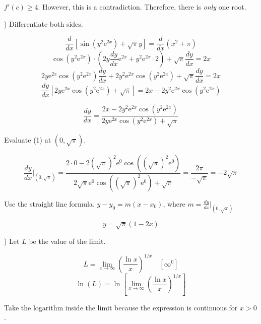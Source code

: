 \documentclass{article}
\begin{document}
\hfill

\noindent $f'(c)\geq4$. However, this is a contradiction. Therefore, there is \textit{only} one root.

\hfill

) Differentiate both sides.

\[\frac d{dx}\left[\sin(y^2\mathrm{e}^{2x})+\sqrt\pi y\right] =\frac {d}{dx} \left(x^2+\pi\right)\]
\[\cos\left(y^2\mathrm{e}^{2x}\right)\cdot\left(2y{\frac{dy}{dx}\mathrm{e}^{2x}}+y^2\mathrm{e}^{2x}\cdot2\right)+\sqrt\pi\frac{dy}{dx}=2x\]
\[2y{\mathrm{e}^{2x}}\cos\left(y^2\mathrm{e}^{2x}\right)\frac{dy}{dx}+2y^2\mathrm{e}^{2x}\cos\left(y^2\mathrm{e}^{2x}\right)+\sqrt\pi\frac{dy}{dx}=2x\]
\[\frac{dy}{dx}\left[2y\mathrm{e}^{2x}\cos\left(y^2\mathrm{e}^{2x}\right)+\sqrt\pi\right]=2x-2y^2{\mathrm{e}^{2x}}\cos\left(y^2\mathrm{e}^{2x}\right)\]

\begin{equation}\frac{dy}{dx}=\frac{2x-2y^2{\mathrm{e}^{2x}}\cos\left(y^2\mathrm{e}^{2x}\right)}{2y\mathrm{e}^{2x}\cos\left(y^2\mathrm{e}^{2x}\right)+\sqrt\pi}\end{equation}

\hfill

\noindent Evaluate (1) at $\left(0, \sqrt\pi\right)$.

\begin{equation*}\frac{dy}{dx}\Bigg|_{\left(0, \sqrt\pi\right)}=\frac{2\cdot0-2\left(\sqrt\pi\right)^2{\mathrm{e}^{0}}\cos\left(\left(\sqrt\pi\right)^2\mathrm{e}^{0}\right)}{2\sqrt\pi\mathrm{e}^{0}\cos\left(\left(\sqrt\pi\right)^2\mathrm{e}^{0}\right)+\sqrt\pi}=\frac{2\pi}{-\sqrt\pi}=-2\sqrt\pi\end{equation*}

\hfill

\noindent Use the straight line formula. $y-y_0 = m(x-x_0)$, where $\displaystyle m=\frac{dy}{dx}\Bigg|_{\left(0, \sqrt\pi\right)}$

\begin{equation*}\boxed{y=\sqrt\pi(1-2x)}\end{equation*}

\newpage

) Let $L$ be the value of the limit.

\[L =\lim_{x\to \infty} \left(\frac{\ln x}x\right)^{1/x}\quad \left[\infty^0\right]\]
\[\ln(L) =\ln\left[\lim_{x\to \infty} \left(\frac{\ln x}x\right)^{1/x}\right]\]

\hfill

\noindent Take the logarithm inside the limit because the expression is continuous for $x>0$.
\end{document}
